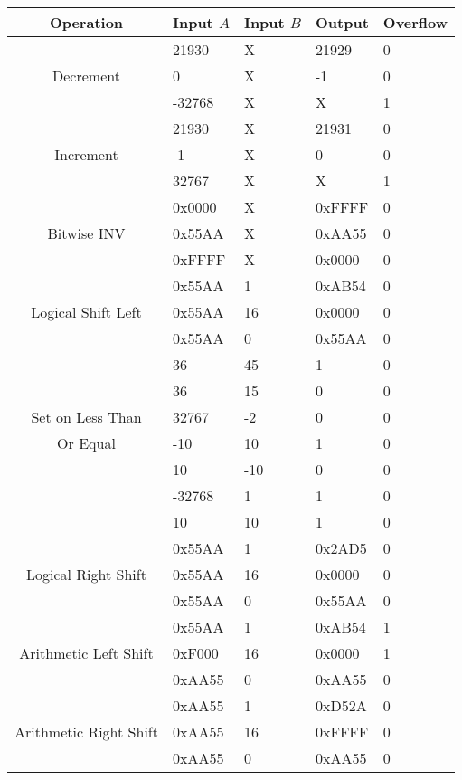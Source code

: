 \documentclass[11pt]{article}
\begin{document}
{\centering
\begin{tabular}{|c|l|l|l|l|}
	\hline
	\textbf{Operation} & \textbf{Input $A$} & \textbf{Input $B$} & \textbf{Output} & \textbf{Overflow} \\
	\hline
	
	\multirow{3}{*}{Decrement} & 21930 & X & 21929 & 0 \\
	& 0 & X & -1 & 0 \\
	& -32768 & X & X & 1 \\
	\hline
	
	\multirow{3}{*}{Increment} & 21930 & X & 21931 & 0 \\
	& -1 & X & 0 & 0 \\
	& 32767 & X & X & 1 \\
	\hline
	
	\multirow{3}{*}{Bitwise INV} & 0x0000 & X & 0xFFFF & 0 \\
	& 0x55AA & X & 0xAA55 & 0 \\
	& 0xFFFF & X & 0x0000 & 0 \\
	\hline
	
	\multirow{3}{*}{Logical Shift Left} & 0x55AA & 1 & 0xAB54 & 0 \\
	& 0x55AA & 16 & 0x0000 & 0 \\
	& 0x55AA & 0 & 0x55AA & 0 \\
	\hline
	
	& 36 & 45 & 1 & 0 \\
	& 36 & 15 & 0 & 0 \\
	Set on Less Than & 32767 & -2 & 0 & 0 \\
	Or Equal & -10 & 10 & 1 & 0 \\
	& 10 & -10 & 0 & 0 \\
	& -32768 & 1 & 1 & 0 \\
	& 10 & 10 & 1 & 0 \\
	\hline
	
	\multirow{3}{*}{Logical Right Shift} & 0x55AA & 1 & 0x2AD5 & 0 \\
	& 0x55AA & 16 & 0x0000 & 0 \\
	& 0x55AA & 0 & 0x55AA & 0 \\
	\hline
	
	\multirow{3}{*}{Arithmetic Left Shift} & 0x55AA & 1 & 0xAB54 & 1 \\
	& 0xF000 & 16 & 0x0000 & 1 \\
	& 0xAA55 & 0 & 0xAA55 & 0 \\
	\hline
	
	\multirow{3}{*}{Arithmetic Right Shift} & 0xAA55 & 1 & 0xD52A & 0 \\
	& 0xAA55 & 16 & 0xFFFF & 0 \\
	& 0xAA55 & 0 & 0xAA55 & 0 \\
	\hline
\end{tabular} \par 
}
\end{document}
